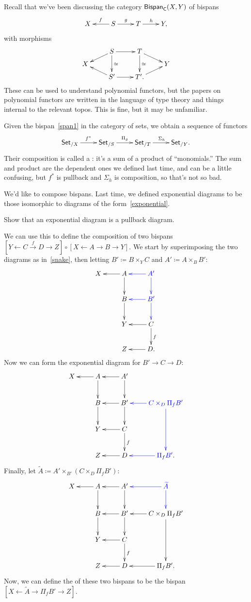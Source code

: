 Recall that we've been discussing the category $\mathsf{Bispan}_\mathsf C(X,Y)$ of bispans
\begin{equation}
\label{span1}
\xymatrix{
	X & S\ar[l]_f\ar[r]^g & T\ar[r]^h & Y,
}
\end{equation}
with morphisms
\[\xymatrix@R=0.2cm{
	& S\ar[r]\ar[dl]\ar[dd]^\cong & T\ar[dd]^\cong\ar[dr]\\
	X &&& Y\\
	& S'\ar[r]\ar[ul] & T'.\ar[ur]
}\]
These can be used to understand polynomial functors, but the papers on polynomial functors are written in the
language of type theory and things internal to the relevant topos. This is fine, but it may be unfamiliar.

Given the bispan~\eqref{span1} in the category of sets, we obtain a sequence of functors
\[\xymatrix{
	\Set_{/X}\ar[r]^{f^*} & \Set_{/S}\ar[r]^{\Pi_g} & \Set_{/T}\ar[r]^{\Sigma_h} & \Set_{/Y}.
}\]
Their composition is called a : it's a sum of a product of ``monomials.'' The sum and
product are the dependent ones we defined last time, and can be a little confusing, but $f^*$ is pullback and
$\Sigma_h$ is composition, so that's not so bad.

We'd like to compose bispans. Last time, we defined exponential diagrams to be those isomorphic to diagrams of the
form~\eqref{exponential}.
\begin{ex}
Show that an exponential diagram is a pullback diagram.
\end{ex}
We can use this to define the composition of two bispans $[Y\gets C\stackrel f\to D\to Z]\circ[X\gets A\to B\to
Y]$. We start by superimposing the two diagrams as in~\eqref{snake}, then letting $B'\coloneqq B\times_Y C$ and
$A'\coloneqq A\times_B B'$:
\[\xymatrix{
	X & A\ar[l]\ar[d] & \textcolor{blue}{A'}\ar@[blue][l]\ar@[blue][d]\\
	& B\ar[d] & \textcolor{blue}{B'}\ar@[blue][l]\ar@[blue][d]\\
	& Y & C\ar[l]\ar[d]^f\\
	& Z & D.\ar[l]
}\]
Now we can form the exponential diagram for $B'\to C\to D$:
\[\xymatrix{
	X & A\ar[l]\ar[d] & A'\ar[l]\ar[d]\\
	& B\ar[d] & B'\ar[l]\ar[d] & \textcolor{blue}{C\times_D\Pi_fB'}\ar@[blue][l]\ar@[blue][dd]\\
	& Y & C\ar[l]\ar[d]^f\\
	& Z & D\ar[l] & \textcolor{blue}{\Pi_fB'}.\ar@[blue][l]
}\]
Finally, let $\widetilde A\coloneqq A'\times_{B'} (C\times_D\Pi_fB')$:
\[\xymatrix{
	X & A\ar[l]\ar[d] & A'\ar[l]\ar[d] & \textcolor{blue}{\widetilde A}\ar@[blue][l]\ar@[blue][d]\\
	& B\ar[d] & B'\ar[l]\ar[d] & C\times_D\Pi_fB'\ar[l]\ar[dd]\\
	& Y & C\ar[l]\ar[d]^f\\
	& Z & D\ar[l] & \Pi_fB'.\ar[l]
}\]
Now, we can define the  of these two bispans to be the bispan $[X\gets \widetilde A\to\Pi_fB'\to
Z]$.

